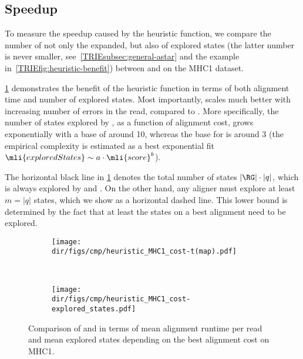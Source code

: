 \subsection{\A Speedup}
To measure the speedup caused by the heuristic function, we compare the number
of not only the expanded, but also of explored states (the latter number is
never smaller, see~\cref{TRIEsubsec:general-astar} and the example
in~\cref{TRIEfig:heuristic-benefit}) between \astarix and \dijkstra on the MHC1
dataset.

\cref{TRIEfig:scaling_with_errors} demonstrates the benefit of the heuristic
function in terms of both alignment time and number of explored states. Most
importantly, \astarix scales much better with increasing number of errors in the
read, compared to \dijkstra. More specifically, the number of states explored by
\dijkstra, as a function of alignment cost, grows exponentially with a base of 
around 10, whereas the base for \astarix is around 3 (the empirical complexity is
estimated as a best exponential fit \mbox{$\mli{exploredStates} \sim a \cdot
\mli{score}^b$}).

The horizontal black line in \cref{TRIEfig:scaling_with_errors} denotes the total
number of states $\lvert \RG \rvert \cdot \lvert q \rvert$, which is always
explored by \bitparallel and \pasgal. On the other hand, any aligner must
explore at least $m = \lvert q \rvert$ states, which we show as a horizontal
dashed line. This lower bound is determined by the fact that at least the states
on a best alignment need to be explored.

\begin{figure}[t]
  \begin{subfigure}{.45\textwidth}
    \centering
    \texttt{[image: \\dir/figs/cmp/heuristic\_MHC1\_cost-t(map).pdf]}
  \end{subfigure}~\hspace{1em}
  \begin{subfigure}{.49\textwidth}
    \centering
    \texttt{[image: \\dir/figs/cmp/heuristic\_MHC1\_cost-explored\_states.pdf]}
  \end{subfigure}%
  \caption{Comparison of \A and \dijkstra in terms of mean alignment runtime per read and mean explored states depending on the best alignment cost on MHC1.}
  \label{TRIEfig:scaling_with_errors}
\end{figure}